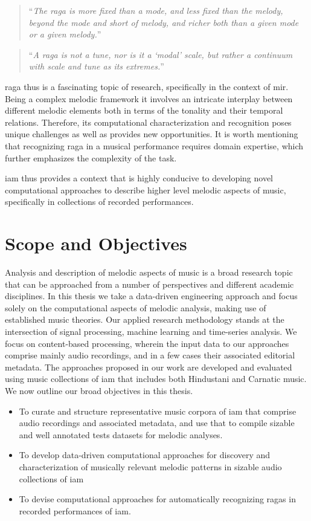 \blockcquote[p. 96]{martinez2001semiosis}{``\textit{The \gls{raga} is more fixed than a mode, and less fixed than the melody, beyond the mode and short of melody, and richer both than a given mode or a given melody.}''}


\blockcquote[]{powers1963background}{``\textit{A \gls{raga} is not a tune, nor is it a `modal' scale, but rather a continuum with scale and tune as its extremes.}''}

\Gls{raga} thus is a fascinating topic of research, specifically in the context of \gls{mir}. Being a complex melodic framework it involves an intricate interplay between different melodic elements both in terms of the tonality and their temporal relations. Therefore, its computational characterization and recognition poses unique challenges as well as provides new opportunities. It is worth mentioning that recognizing \gls{raga} in a musical performance requires domain expertise, which further emphasizes the complexity of the task.

\gls{iam} thus provides a context that is highly conducive to developing novel computational approaches to describe higher level melodic aspects of music, specifically in collections of recorded performances. 


\section{Scope and Objectives}
\label{sec:scope_objectives}

Analysis and description of melodic aspects of music is a broad research topic that can be approached from a number of perspectives and different academic disciplines. In this thesis we take a data-driven engineering approach and focus solely on the computational aspects of melodic analysis, making use of established music theories. Our applied research methodology stands at the intersection of signal processing, machine learning and time-series analysis. We focus on content-based processing, wherein the input data to our approaches comprise mainly audio recordings, and in a few cases their associated editorial metadata. The approaches proposed in our work are developed and evaluated using music collections of \gls{iam} that includes both Hindustani and Carnatic music. We now outline our broad objectives in this thesis.

\begin{itemize}
	\item To curate and structure representative music corpora of \gls{iam} that comprise audio recordings and associated metadata, and use that to compile sizable and well annotated tests datasets for melodic analyses.
	\item To develop data-driven computational approaches for discovery and characterization of musically relevant melodic patterns in sizable audio collections of \gls{iam}
	\item To devise computational approaches for automatically recognizing \glspl{raga} in recorded performances of \gls{iam}.
\end{itemize}

